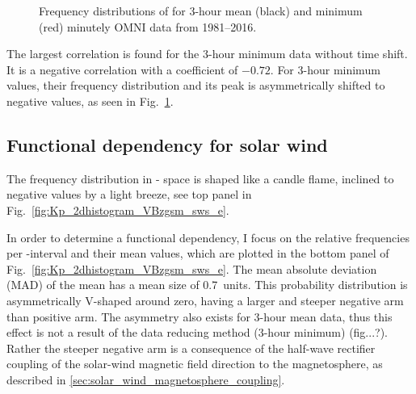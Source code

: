 \begin{figure}[htb]
\begin{floatrow}
{		}{
			\caption{Frequency distributions of \vBz{} for 3-hour mean (black) and minimum (red) minutely OMNI data from 1981--2016.}
			\label{fig:histogram_VBzgsm}
		}
	\end{floatrow}
\end{figure}
The largest correlation is found for the 3-hour minimum data without time shift. It is a negative correlation with a coefficient of $-0.72$. For \vBz{} 3-hour minimum values, their frequency distribution and its peak is asymmetrically shifted to negative values, as seen in Fig.~\ref{fig:histogram_VBzgsm}.


\subsection{Functional dependency for solar wind}
The frequency distribution in \Kp-\vBz{} space is shaped like a candle flame, inclined to negative values by a light breeze, see top panel in Fig.~\ref{fig:Kp_2dhistogram_VBzgsm_sws_e}.
\begin{figure}
\end{figure}
In order to determine a functional dependency, I focus on the relative frequencies per \vBz-interval and their mean \Kp{} values, which are plotted in the bottom panel of Fig.~\ref{fig:Kp_2dhistogram_VBzgsm_sws_e}. The mean absolute deviation (MAD) of the mean has a mean size of \SI{0.7}{\Kp}~units. This probability distribution is asymmetrically V-shaped around zero, having a larger and steeper negative arm than positive arm. The asymmetry also exists for 3-hour mean data, thus this effect is not a result of the data reducing method (3-hour minimum) (fig...?). Rather the steeper negative arm is a consequence of the half-wave rectifier coupling of the solar-wind magnetic field direction to the magnetosphere, as described in \autoref{sec:solar_wind_magnetosphere_coupling}.\\
